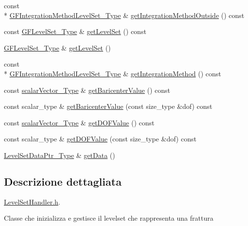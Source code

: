 \begin{DoxyCompactItemize}
\item 
const \\*
\hyperlink{Core_8h_ade18ba6e17965b6fdd50b3382b2a7020}{G\-F\-Integration\-Method\-Level\-Set\-\_\-\-Type} \& \hyperlink{classLevelSetHandler_a155cedf651006dc5509c34a6ea5e3324}{get\-Integration\-Method\-Outside} () const 
\item 
const \hyperlink{Core_8h_a71358a15bd3925629e26ccbb214a0133}{G\-F\-Level\-Set\-\_\-\-Type} \& \hyperlink{classLevelSetHandler_aa899ffbee62631067378346d61fd172a}{get\-Level\-Set} () const 
\item 
\hyperlink{Core_8h_a71358a15bd3925629e26ccbb214a0133}{G\-F\-Level\-Set\-\_\-\-Type} \& \hyperlink{classLevelSetHandler_a88f16d61da1d2a2a68d5ef33fa77a41d}{get\-Level\-Set} ()
\item 
const \\*
\hyperlink{Core_8h_ade18ba6e17965b6fdd50b3382b2a7020}{G\-F\-Integration\-Method\-Level\-Set\-\_\-\-Type} \& \hyperlink{classLevelSetHandler_ad35aef3284c2582550b376fd3e99c45f}{get\-Integration\-Method} () const 
\item 
const \hyperlink{Core_8h_a4e75b5863535ba1dd79942de2846eff0}{scalar\-Vector\-\_\-\-Type} \& \hyperlink{classLevelSetHandler_a983463087a38199510a0859658ad5291}{get\-Baricenter\-Value} () const 
\item 
const scalar\-\_\-type \& \hyperlink{classLevelSetHandler_a7a4653958485195d2b995be4d52e2765}{get\-Baricenter\-Value} (const size\-\_\-type \&dof) const 
\item 
const \hyperlink{Core_8h_a4e75b5863535ba1dd79942de2846eff0}{scalar\-Vector\-\_\-\-Type} \& \hyperlink{classLevelSetHandler_ac46f075503657b1481d80acb5d3307d1}{get\-D\-O\-F\-Value} () const 
\item 
const scalar\-\_\-type \& \hyperlink{classLevelSetHandler_ab9babfc6e7705047b005a88b4ab1f46f}{get\-D\-O\-F\-Value} (const size\-\_\-type \&dof) const 
\item 
\hyperlink{LevelSetData_8h_a7750f14ec1c622b3c69aa0c5c2894972}{Level\-Set\-Data\-Ptr\-\_\-\-Type} \& \hyperlink{classLevelSetHandler_ab24897cb969210d278f54d94fd8f8977}{get\-Data} ()
\end{DoxyCompactItemize}


\subsection{Descrizione dettagliata}
\hyperlink{LevelSetHandler_8h}{Level\-Set\-Handler.\-h}. 

Classe che inizializza e gestisce il levelset che rappresenta una frattura 

